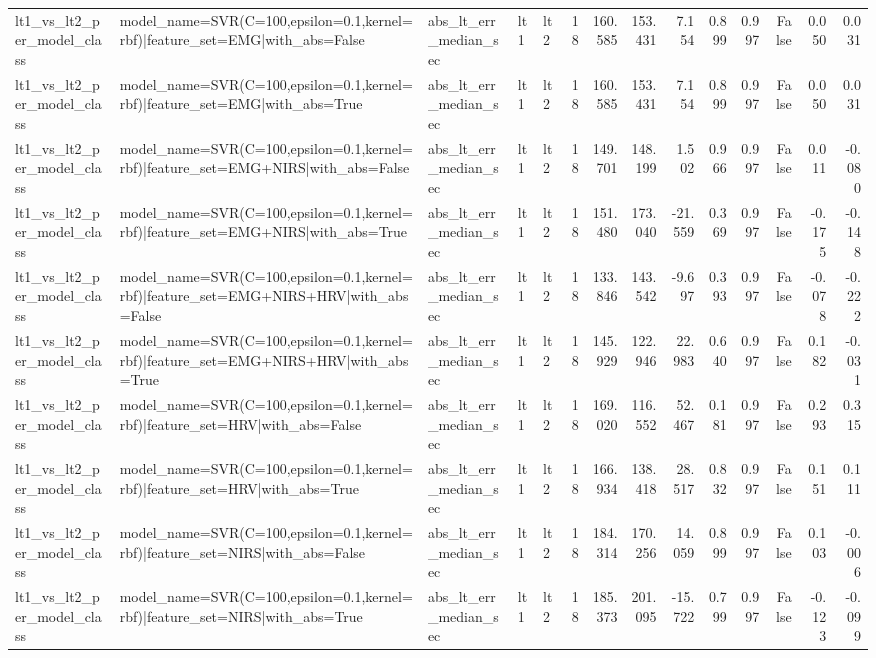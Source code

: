 \begin{table}
\begin{tabular}{lllllrrrrrrrrr}
lt1_vs_lt2_per_model_class & model_name=SVR(C=100,epsilon=0.1,kernel=rbf)|feature_set=EMG|with_abs=False & abs_lt_err_median_sec & lt1 & lt2 & 18 & 160.585 & 153.431 & 7.154 & 0.899 & 0.997 & False & 0.050 & 0.031 \\
lt1_vs_lt2_per_model_class & model_name=SVR(C=100,epsilon=0.1,kernel=rbf)|feature_set=EMG|with_abs=True & abs_lt_err_median_sec & lt1 & lt2 & 18 & 160.585 & 153.431 & 7.154 & 0.899 & 0.997 & False & 0.050 & 0.031 \\
lt1_vs_lt2_per_model_class & model_name=SVR(C=100,epsilon=0.1,kernel=rbf)|feature_set=EMG+NIRS|with_abs=False & abs_lt_err_median_sec & lt1 & lt2 & 18 & 149.701 & 148.199 & 1.502 & 0.966 & 0.997 & False & 0.011 & -0.080 \\
lt1_vs_lt2_per_model_class & model_name=SVR(C=100,epsilon=0.1,kernel=rbf)|feature_set=EMG+NIRS|with_abs=True & abs_lt_err_median_sec & lt1 & lt2 & 18 & 151.480 & 173.040 & -21.559 & 0.369 & 0.997 & False & -0.175 & -0.148 \\
lt1_vs_lt2_per_model_class & model_name=SVR(C=100,epsilon=0.1,kernel=rbf)|feature_set=EMG+NIRS+HRV|with_abs=False & abs_lt_err_median_sec & lt1 & lt2 & 18 & 133.846 & 143.542 & -9.697 & 0.393 & 0.997 & False & -0.078 & -0.222 \\
lt1_vs_lt2_per_model_class & model_name=SVR(C=100,epsilon=0.1,kernel=rbf)|feature_set=EMG+NIRS+HRV|with_abs=True & abs_lt_err_median_sec & lt1 & lt2 & 18 & 145.929 & 122.946 & 22.983 & 0.640 & 0.997 & False & 0.182 & -0.031 \\
lt1_vs_lt2_per_model_class & model_name=SVR(C=100,epsilon=0.1,kernel=rbf)|feature_set=HRV|with_abs=False & abs_lt_err_median_sec & lt1 & lt2 & 18 & 169.020 & 116.552 & 52.467 & 0.181 & 0.997 & False & 0.293 & 0.315 \\
lt1_vs_lt2_per_model_class & model_name=SVR(C=100,epsilon=0.1,kernel=rbf)|feature_set=HRV|with_abs=True & abs_lt_err_median_sec & lt1 & lt2 & 18 & 166.934 & 138.418 & 28.517 & 0.832 & 0.997 & False & 0.151 & 0.111 \\
lt1_vs_lt2_per_model_class & model_name=SVR(C=100,epsilon=0.1,kernel=rbf)|feature_set=NIRS|with_abs=False & abs_lt_err_median_sec & lt1 & lt2 & 18 & 184.314 & 170.256 & 14.059 & 0.899 & 0.997 & False & 0.103 & -0.006 \\
lt1_vs_lt2_per_model_class & model_name=SVR(C=100,epsilon=0.1,kernel=rbf)|feature_set=NIRS|with_abs=True & abs_lt_err_median_sec & lt1 & lt2 & 18 & 185.373 & 201.095 & -15.722 & 0.799 & 0.997 & False & -0.123 & -0.099 \\

\end{tabular}
\end{table}
